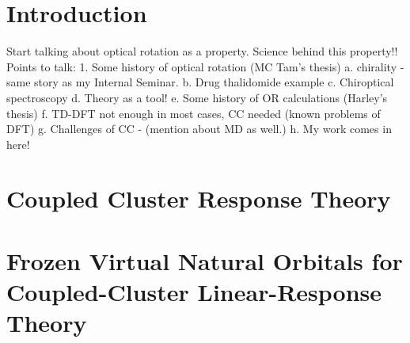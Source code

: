 \documentclass[12pt]{report}
\begin{document}
\tableofcontents
\pagebreak

\listoffigures
\pagebreak

\listoftables
\pagebreak

\pagestyle{myheadings}

\chapter{Introduction}

Start talking about optical rotation as a property. Science behind this property!!
Points to talk:
1. Some history of optical rotation (MC Tam's thesis)
	a. chirality - same story as my Internal Seminar.
	b. Drug thalidomide example
	c. Chiroptical spectroscopy
	d. Theory as a tool! 
	e. Some history of OR calculations (Harley's thesis)
	f. TD-DFT not enough in most cases, CC needed (known problems of DFT)
	g. Challenges of CC - (mention about MD as well.) 
	h. My work comes in here!

\chapter{Coupled Cluster Response Theory}
\chapter{Frozen Virtual Natural Orbitals for Coupled-Cluster Linear-Response Theory}

\end{document}
